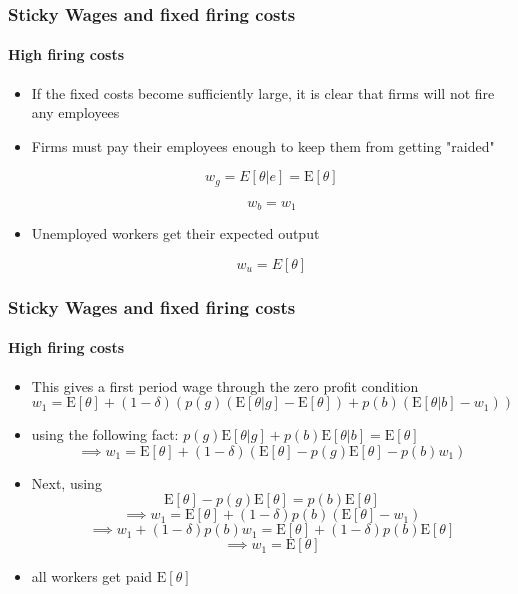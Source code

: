 \documentclass{beamer}
\newcommand{\E}{\mathrm{E}}
\begin{document}
\begin{frame}
\frametitle{Sticky Wages and fixed firing costs}

\framesubtitle{High firing costs}

\begin{itemize}
	\setlength{\itemsep}{3mm}
	\item If the fixed costs become sufficiently large, it is clear that firms will not fire any employees
	
	\item Firms must pay their employees enough to keep them from getting "raided"
	
	$$ w_g = E[\theta | e] =\E[\theta]$$
	
	$$ w_b = w_1$$ 
	
	\item Unemployed workers get their expected output 
	
	$$ w_u = E[\theta] $$
	
\end{itemize}

\end{frame}

\begin{frame}
\frametitle{Sticky Wages and fixed firing costs}

\framesubtitle{High firing costs}

\begin{itemize}
	\setlength{\itemsep}{3mm}
	\item This gives a first period wage through the zero profit condition 
	$$w_1 = \E[\theta] + (1-\delta)(p(g)(\E[\theta|g] - \E[\theta]) + p(b)(\E[\theta|b] - w_1))$$
	\item using the following fact: $p(g)\E[\theta|g] + p(b)\E[\theta|b] = \E[\theta]$
	$$ \implies w_1 = \E[\theta] +  (1-\delta)(\E[\theta] - p(g)\E[\theta] - p(b)w_1)$$
	\item Next, using 
	$$ \E[\theta] - p(g)\E[\theta] = p(b)\E[\theta]$$
	$$ \implies  w_1 = \E[\theta] +  (1-\delta)p(b)(\E[\theta] - w_1) $$
	$$ \implies w_1 +(1-\delta)p(b)w_1 = \E[\theta] + (1-\delta)p(b)\E[\theta]$$
	$$ \implies w_1 = \E[\theta]$$
	\item all workers get paid $\E[\theta]$
	
	
\end{itemize}

\end{frame}
\end{document}
